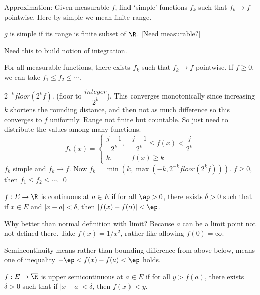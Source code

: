 Approximation: Given measurable $f$, find `simple' functions $f_k$ such that $f_k \to f$ pointwise. Here by simple we mean finite range. 

\begin{dfn}[Simple]
$g$ is simple if its range is finite subset of $\R$. [Need measurable?]
\end{dfn}


Need this to build notion of integration. 

\begin{thm}
For all measurable functions, there exists $f_k$ such that $f_k \to f$ pointwise. If $f \geq 0$, we can take $f_1 \leq f_2 \leq \cdots$.
\end{thm}

\pf $2^{-k} floor(2^k f)$. (floor to $\dfrac{integer}{2^k}$). This converges monotonically since increasing $k$ shortens the rounding distance, and then not as much difference so this converges to $f$ uniformly. Range not finite but countable. So just need to distribute the values among many functions. 
	\[
	f_k(x)=
	\begin{cases}
	\dfrac{j-1}{2^k}, & \dfrac{j-1}{2^k} \leq f(x) < \dfrac{j}{2^k} \\
	k, & f(x) \geq k
	\end{cases}
	\]
$f_k$ simple and $f_k \to f$. Now $f_k= \min(k,\max(-k,2^{-k}floor(2^kf)))$. $f \geq 0$, then $f_1 \leq f_2 \leq \cdots$. 
\qed \\








\begin{dfn}
$f: E \to \R$ is continuous at $a \in E$ if for all $\ep>0$, there exists $\delta>0$ such that if $x \in E$ and $|x-a|<\delta$, then $|f(x)-f(a)|<\ep$.
\end{dfn}

Why better than normal definition with limit? Because $a$ can be a limit point not not defined there. Take $f(x)=1/x^2$, rather like allowing $f(0)=\infty$. 


Semincontinuity means rather than bounding difference from above below, means one of inequality $-\ep<f(x)-f(a)<\ep$ holds. 




\begin{dfn}
$f: E \to \overline{\R}$ is upper semicontinuous at $a \in E$ if for all $y>f(a)$, there exists $\delta>0$ such that if $|x-a|<\delta$, then $f(x)<y$. 
\end{dfn}

